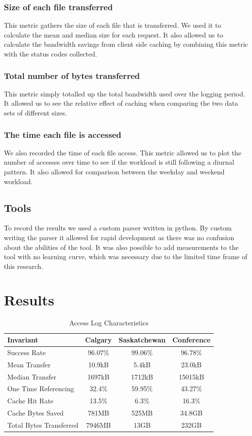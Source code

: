 \documentclass[10pt,conference]{IEEEtran}
\begin{document}
\subsubsection{Size of each file transferred}
This metric gathers the size of each file that is transferred. We used it to calculate the mean and median size for each request. 
It also allowed us to calculate the bandwidth savings from client side caching by combining this metric with the status codes collected.

\subsubsection{Total number of bytes transferred}
This metric simply totalled up the total bandwidth used over the logging period. It allowed us to see the relative effect of caching when comparing the two data sets of different sizes.

\subsubsection{The time each file is accessed}
We also recorded the time of each file access. This metric allowed us to plot the number of accesses over time to see if the workload is still following a diurnal pattern. It also allowed for comparison between the weekday and weekend workload.

\subsection{Tools}
To record the results we used a custom parser written in python. By custom writing the parser it allowed for rapid development as there was no confusion about the abilities of the tool. It was also possible to add measurements to the tool with no learning curve, which was necessary due to the limited time frame of this research.

\section{Results}\label{results}

\begin{table}
    \caption{Access Log Characteristics}\label{tab:characteristics}
    \begin{tabular}[ht!]{ | l || c | c | c | }
        \hline
        Invariant & Calgary & Saskatchewan & Conference \\
        \hline
        Success Rate & 96.07\% & 99.06\% & 96.78\% \\
        Mean Transfer & 10.9kB & 5.4kB & 23.0kB \\
        Median Transfer & 1697kB & 1712kB & 15015kB \\
        One Time Referencing & 32.4\% & 59.95\% & 43.27\% \\
        Cache Hit Rate & 13.5\% & 6.3\% & 16.3\% \\
        Cache Bytes Saved & 781MB & 525MB & 34.8GB \\
        Total Bytes Transferred & 7946MB & 13GB & 232GB \\
        \hline
    \end{tabular}
\end{table}
\end{document}
